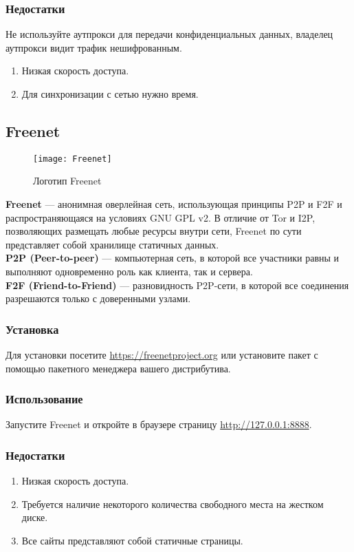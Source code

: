 \subsubsection{Недостатки}
\begin{important}
Не используйте аутпрокси для передачи конфиденциальных данных, владелец аутпрокси видит трафик нешифрованным.
\end{important}
\begin{enumerate}
\item Низкая скорость доступа.
\item Для синхронизации с сетью нужно время.
\end{enumerate}
\subsection{Freenet}
\begin{wrapfigure}[9]{r}{0.25\linewidth}
\texttt{[image: Freenet]}
\caption{Логотип Freenet}
\end{wrapfigure}
\textbf{Freenet} --- анонимная оверлейная сеть, использующая принципы P2P и F2F и распространяющаяся на условиях GNU GPL v2\cite{freenet_license}. В отличие от Tor и I2P, позволяющих размещать любые ресурсы внутри сети, Freenet по сути представляет собой хранилище статичных данных.\\
\textbf{P2P (Peer-to-peer)} --- компьютерная сеть, в которой все участники равны и выполняют одновременно роль как клиента, так и сервера.\\
\textbf{F2F (Friend-to-Friend)} --- разновидность P2P-сети, в которой все соединения разрешаются только с доверенными узлами.
\subsubsection{Установка}
Для установки посетите \url{https://freenetproject.org} или установите пакет с помощью пакетного менеджера вашего дистрибутива.
\subsubsection{Использование}
Запустите Freenet и откройте в браузере страницу \url{http://127.0.0.1:8888}.
\subsubsection{Недостатки}
\begin{enumerate}
\item Низкая скорость доступа.
\item Требуется наличие некоторого количества свободного места на жестком диске.
\item Все сайты представляют собой статичные страницы.
\end{enumerate}
